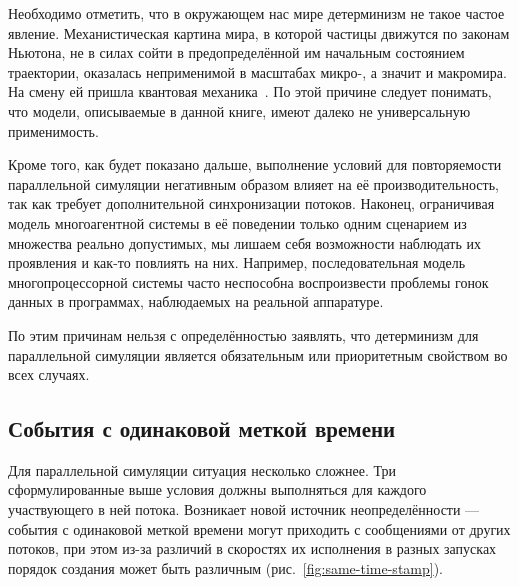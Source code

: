 \begin{digression}
Необходимо отметить, что в окружающем нас мире детерминизм не такое частое явление. Механистическая картина мира, в которой частицы движутся по законам Ньютона, не в силах сойти в предопределённой им начальным состоянием траектории, оказалась неприменимой в масштабах микро-, а значит и макромира. На смену ей пришла квантовая механика~\cite{ivanov-theorphys}. По этой причине следует понимать, что модели, описываемые в данной книге, имеют далеко не универсальную применимость.

Кроме того, как будет показано дальше, выполнение условий для повторяемости параллельной симуляции негативным образом влияет на её производительность, так как требует дополнительной синхронизации потоков. Наконец, ограничивая модель многоагентной системы в её поведении только одним сценарием из множества реально допустимых, мы лишаем себя возможности наблюдать их проявления и как-то повлиять на них. Например, последовательная модель многопроцессорной системы часто неспособна воспроизвести проблемы гонок данных в программах, наблюдаемых на реальной аппаратуре.

По этим причинам нельзя с определённостью заявлять, что детерминизм для параллельной симуляции является обязательным или приоритетным свойством во всех случаях.

\end{digression}

\subsection{События с одинаковой меткой времени}

Для параллельной симуляции ситуация несколько сложнее. Три сформулированные выше условия должны выполняться для каждого участвующего в ней потока. Возникает новой источник неопределённости --- события с одинаковой меткой времени могут приходить с сообщениями от других потоков, при этом из-за различий в скоростях их исполнения в разных запусках порядок создания может быть различным (рис.~\ref{fig:same-time-stamp}). 

